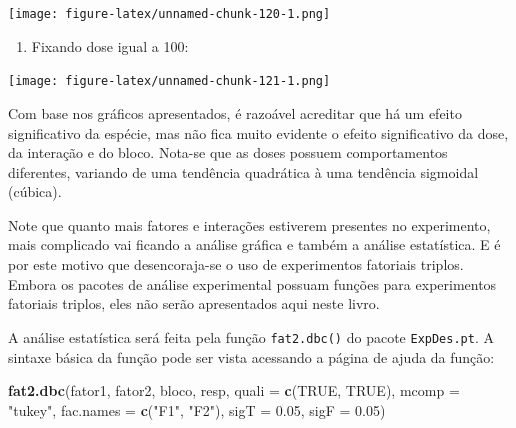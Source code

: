 \documentclass[
]{article}
\newenvironment{Shaded}{\begin{snugshade}}{\end{snugshade}}
\newcommand{\DataTypeTok}[1]{\textcolor[rgb]{0.13,0.29,0.53}{#1}}
\newcommand{\DecValTok}[1]{\textcolor[rgb]{0.00,0.00,0.81}{#1}}
\newcommand{\FloatTok}[1]{\textcolor[rgb]{0.00,0.00,0.81}{#1}}
\newcommand{\KeywordTok}[1]{\textcolor[rgb]{0.13,0.29,0.53}{\textbf{#1}}}
\newcommand{\NormalTok}[1]{#1}
\newcommand{\OperatorTok}[1]{\textcolor[rgb]{0.81,0.36,0.00}{\textbf{#1}}}
\newcommand{\OtherTok}[1]{\textcolor[rgb]{0.56,0.35,0.01}{#1}}
\newcommand{\StringTok}[1]{\textcolor[rgb]{0.31,0.60,0.02}{#1}}
\providecommand{\tightlist}{%
  \setlength{\itemsep}{0pt}\setlength{\parskip}{0pt}}
\begin{document}
\texttt{[image: figure-latex/unnamed-chunk-120-1.png]}

\begin{enumerate}
\def\labelenumi{\arabic{enumi}.}
\setcounter{enumi}{11}
\tightlist
\item
  Fixando dose igual a 100:
\end{enumerate}

\begin{Shaded}
\end{Shaded}

\texttt{[image: figure-latex/unnamed-chunk-121-1.png]}

Com base nos gráficos apresentados, é razoável acreditar que há um efeito significativo da espécie, mas não fica muito evidente o efeito significativo da dose, da interação e do bloco. Nota-se que as doses possuem comportamentos diferentes, variando de uma tendência quadrática à uma tendência sigmoidal (cúbica).

Note que quanto mais fatores e interações estiverem presentes no experimento, mais complicado vai ficando a análise gráfica e também a análise estatística. E é por este motivo que desencoraja-se o uso de experimentos fatoriais triplos. Embora os pacotes de análise experimental possuam funções para experimentos fatoriais triplos, eles não serão apresentados aqui neste livro.

A análise estatística será feita pela função \texttt{fat2.dbc()} do pacote \texttt{ExpDes.pt}. A sintaxe básica da função pode ser vista acessando a página de ajuda da função:

\begin{Shaded}
\begin{Highlighting}[]
\KeywordTok{fat2.dbc}\NormalTok{(fator1, fator2, bloco, resp, }\DataTypeTok{quali =} \KeywordTok{c}\NormalTok{(}\OtherTok{TRUE}\NormalTok{, }\OtherTok{TRUE}\NormalTok{), }
         \DataTypeTok{mcomp =} \StringTok{"tukey"}\NormalTok{, }\DataTypeTok{fac.names =} \KeywordTok{c}\NormalTok{(}\StringTok{"F1"}\NormalTok{, }\StringTok{"F2"}\NormalTok{), }
         \DataTypeTok{sigT =} \FloatTok{0.05}\NormalTok{, }\DataTypeTok{sigF =} \FloatTok{0.05}\NormalTok{)}
\end{Highlighting}
\end{Shaded}
\end{document}
